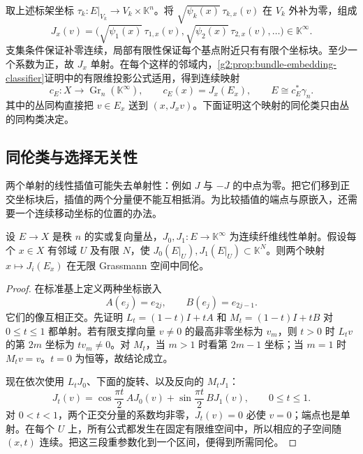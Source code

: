 取上述标架坐标 \(\tau_k:E|_{V_k}\to V_k\times\mathbb K^n\)。将 \(\sqrt{\psi_k(x)}\,\tau_{k,x}(v)\) 在 \(V_k\) 外补为零，组成
\[
	J_x(v)=\bigl(\sqrt{\psi_1(x)}\,\tau_{1,x}(v),
	\sqrt{\psi_2(x)}\,\tau_{2,x}(v),\ldots\bigr)\in\mathbb K^\infty.
\]
支集条件保证补零连续，局部有限性保证每个基点附近只有有限个坐标块。至少一个系数为正，故 \(J_x\) 单射。在每个这样的邻域内，\cref{g2:prop:bundle-embedding-classifier}证明中的有限维投影公式适用，得到连续映射
\[
	c_E:X\longrightarrow\operatorname{Gr}_n(\mathbb K^\infty),
	\qquad c_E(x)=J_x(E_x),\qquad E\cong c_E^*\gamma_n.
\]
其中的丛同构直接把 \(v\in E_x\) 送到 \((x,J_xv)\)。下面证明这个映射的同伦类只由丛的同构类决定。

\subsection{同伦类与选择无关性}
\label{g2:subsec:1903:02}
两个单射的线性插值可能失去单射性：例如 \(J\) 与 \(-J\) 的中点为零。把它们移到正交坐标块后，插值的两个分量便不能互相抵消。为比较插值的端点与原嵌入，还需要一个连续移动坐标的位置的办法。

\begin{lemma}\label{g2:lem:orthogonal-embedding-homotopy}
	设 \(E\to X\) 是秩 \(n\) 的实或复向量丛，\(J_0,J_1:E\to\mathbb K^\infty\) 为连续纤维线性单射。假设每个 \(x\in X\) 有邻域 \(U\) 及有限 \(N\)，使 \(J_0(E|_U),J_1(E|_U)\subset\mathbb K^N\)。则两个映射 \(x\mapsto J_i(E_x)\) 在无限 Grassmann 空间中同伦。
\end{lemma}
\begin{proof}
	在标准基上定义两种坐标嵌入
	\[
		A(e_j)=e_{2j},\qquad B(e_j)=e_{2j-1}.
	\]
	它们的像互相正交。先证明 \(L_t=(1-t)I+tA\) 和 \(M_t=(1-t)I+tB\) 对 \(0\le t\le1\) 都单射。若有限支撑向量 \(v\ne0\) 的最高非零坐标为 \(v_m\)，则 \(t>0\) 时 \(L_tv\) 的第 \(2m\) 坐标为 \(tv_m\ne0\)。对 \(M_t\)，当 \(m>1\) 时看第 \(2m-1\) 坐标；当 \(m=1\) 时 \(M_tv=v\)。\(t=0\) 为恒等，故结论成立。

	现在依次使用 \(L_tJ_0\)、下面的旋转、以及反向的 \(M_tJ_1\)：
	\begin{equation}\label{g2:eq:orthogonal-classifier-rotation}
		J_t(v)=\cos\frac{\pi t}{2}\,AJ_0(v)
		+\sin\frac{\pi t}{2}\,BJ_1(v),\qquad 0\le t\le1.
	\end{equation}
	对 \(0<t<1\)，两个正交分量的系数均非零，\(J_t(v)=0\) 必使 \(v=0\)；端点也是单射。在每个 \(U\) 上，所有公式都发生在固定有限维空间中，所以相应的子空间随 \((x,t)\) 连续。把这三段重参数化到一个区间，便得到所需同伦。
\end{proof}

